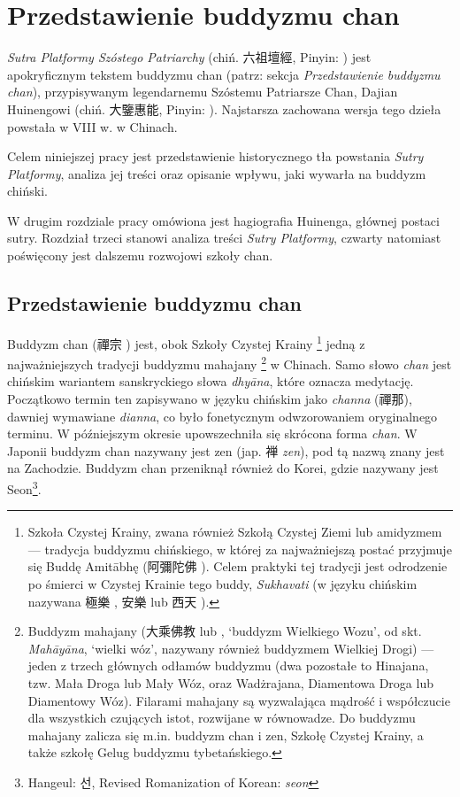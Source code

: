 \chapter{Przedstawienie buddyzmu chan}
\renewcommand{\headrulewidth}{0.3pt}
\textit{Sutra Platformy Szóstego Patriarchy} (chiń. 六祖壇經, Pinyin: ) jest apokryficznym tekstem buddyzmu chan (patrz: sekcja \textit{Przedstawienie buddyzmu chan}), przypisywanym legendarnemu Szóstemu Patriarsze Chan, Dajian Huinengowi (chiń. 大鑒惠能, Pinyin: ). Najstarsza zachowana wersja tego dzieła powstała w VIII w. w Chinach.

Celem niniejszej pracy jest przedstawienie historycznego tła powstania \textit{Sutry Platformy}, analiza jej treści oraz opisanie wpływu, jaki wywarła na buddyzm chiński.

W drugim rozdziale pracy omówiona jest hagiografia Huinenga, głównej postaci sutry.
Rozdział trzeci stanowi analiza treści \textit{Sutry Platformy}, czwarty natomiast poświęcony jest dalszemu rozwojowi szkoły chan.

\section{Przedstawienie buddyzmu chan}
Buddyzm chan (禪宗 ) jest, obok Szkoły Czystej Krainy%
\footnote{Szkoła Czystej Krainy, zwana również Szkołą Czystej Ziemi lub amidyzmem --- tradycja buddyzmu chińskiego, w której za najważniejszą postać przyjmuje się Buddę Amitābhę (阿彌陀佛 ). Celem praktyki tej tradycji jest odrodzenie po śmierci w Czystej Krainie tego buddy, \textit{Sukhavati} (w języku chińskim nazywana 極樂 , 安樂  lub 西天 ).}
jedną z najważniejszych tradycji buddyzmu mahajany%
\footnote{Buddyzm mahajany (大乘佛教  lub , `buddyzm Wielkiego Wozu', od skt. \textit{Mahāyāna}, `wielki wóz', nazywany również buddyzmem Wielkiej Drogi) --- jeden z trzech głównych odłamów buddyzmu (dwa pozostałe to Hinajana, tzw. Mała Droga lub Mały Wóz, oraz Wadżrajana, Diamentowa Droga lub Diamentowy Wóz). Filarami mahajany są wyzwalająca mądrość i współczucie dla wszystkich czujących istot, rozwijane w równowadze. Do buddyzmu mahajany zalicza się m.in. buddyzm chan i zen, Szkołę Czystej Krainy, a także szkołę Gelug buddyzmu tybetańskiego.}
w Chinach. Samo słowo \textit{chan} jest chińskim wariantem %
sanskryckiego słowa \textit{dhyāna}, które oznacza medytację.
Początkowo termin ten zapisywano w języku chińskim jako \textit{channa} (禪那), dawniej wymawiane \textit{dianna}, co było fonetycznym odwzorowaniem oryginalnego terminu.
W późniejszym okresie upowszechniła się skrócona forma \textit{chan}.
W Japonii buddyzm chan nazywany jest zen (jap. {\ipaexgothic 禅} \textit{zen}), pod tą nazwą znany jest na Zachodzie.
Buddyzm chan przeniknął również do Korei, gdzie nazywany jest Seon\footnote{Hangeul: {\Korean 선}, Revised Romanization of Korean: \textit{seon}}.

